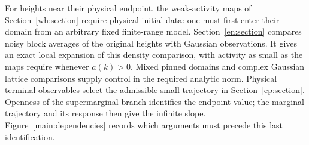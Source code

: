 For heights near their physical endpoint, the weak-activity maps of
Section~\ref{wh:section} require physical initial data: one must first enter their domain from an arbitrary fixed
finite-range model.  Section~\ref{en:section} compares noisy block
averages of the original heights with Gaussian observations.  It gives
an exact local expansion of this density comparison, with activity as
small as the maps require whenever $a(k)>0$.  Mixed pinned domains and
complex Gaussian lattice comparisons supply control in the required
analytic norm.  Physical terminal observables select the admissible small
trajectory in Section~\ref{ep:section}.  Openness of the supermarginal branch identifies the
endpoint value; the marginal trajectory and its response then give
the infinite slope.  Figure~\ref{main:dependencies} records which
arguments must precede this last identification.


